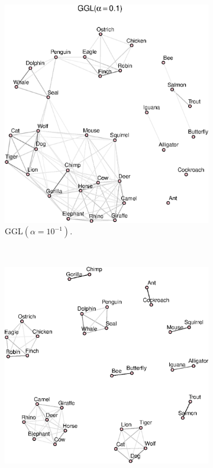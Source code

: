 \begin{figure}[!htb]
    \centering
    \begin{subfigure}[b]{0.475\textwidth}
      \includegraphics[width=\textwidth]{animals/animals_graph_ggl_alpha01.eps}
      \caption{\textsf{GGL}$(\alpha = 10^{-1})$.}
    \end{subfigure}
    ~
    \begin{subfigure}[b]{0.475\textwidth}
      \includegraphics[width=\textwidth]{animals/animals_graph_k10.eps}

\end{subfigure}
\end{figure}
